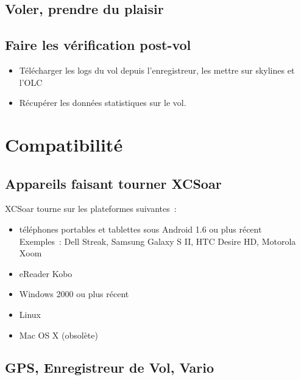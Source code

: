 \subsection*{Voler, prendre du plaisir}
\vspace{4em}

\subsection*{Faire les vérification post-vol}
\begin{itemize}
\item Télécharger les logs du vol depuis l'enregistreur, les mettre sur skylines et l'OLC
\item Récupérer les données statistiques sur le vol.
\end{itemize}
\newpage

\section{Compatibilité}

\subsection*{Appareils faisant tourner XCSoar}

XCSoar tourne sur les plateformes suivantes~:
\begin{itemize}
\item téléphones portables et tablettes sous Android 1.6 ou plus récent \\
 Exemples~: Dell Streak, Samsung Galaxy S II, HTC Desire HD,
 Motorola Xoom
\item eReader Kobo
\item Windows 2000 ou plus récent
\item Linux
\item Mac OS X (obsolète)
\end{itemize}

\subsection*{GPS, Enregistreur de Vol, Vario}

